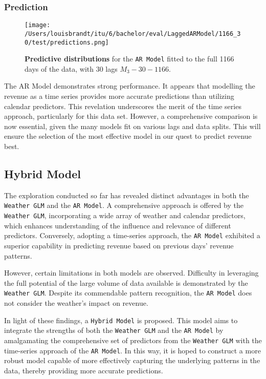 \subsubsection{Prediction}
\begin{figure}[h]
  \centering
  \texttt{[image: /Users/louisbrandt/itu/6/bachelor/eval/LaggedARModel/1166\_30/test/predictions.png]}
  \caption{\textbf{Predictive distributions} for the \texttt{AR Model} fitted to the full 1166 days of the data, with 30 lags $M_{3}{-}30{-}1166$.}
  \label{fig:ar_model_1166_30_predictions}
\end{figure}
The AR Model demonstrates strong performance. It appears that
modelling the revenue as a time series provides more accurate predictions than
utilizing calendar predictors. This revelation underscores the merit of the
time series approach, particularly for this data set. However, a comprehensive
comparison is now essential, given the many models fit on various lags
and data splits. This will ensure the selection of the most effective model in
our quest to predict revenue best.

\subsection{Hybrid Model}

The exploration conducted so far has revealed distinct advantages in both the
\texttt{Weather GLM} and the \texttt{AR Model}. A comprehensive approach is
offered by the \texttt{Weather GLM}, incorporating a wide array of weather and
calendar predictors, which enhances understanding of the influence and
relevance of different predictors. Conversely, adopting a time-series approach,
the \texttt{AR Model} exhibited a superior capability in predicting revenue
based on previous days' revenue patterns.

However, certain limitations in both models are observed. Difficulty in
leveraging the full potential of the large volume of data available is
demonstrated by the \texttt{Weather GLM}. Despite its commendable pattern
recognition, the \texttt{AR Model} does not consider the weather's impact on
revenue.

In light of these findings, a \texttt{Hybrid Model} is proposed. This model
aims to integrate the strengths of both the \texttt{Weather GLM} and the
\texttt{AR Model} by amalgamating the comprehensive set of predictors from the
\texttt{Weather GLM} with the time-series approach of the \texttt{AR Model}. In
this way, it is hoped to construct a more robust model capable of more
effectively capturing the underlying patterns in the data, thereby providing
more accurate predictions.

